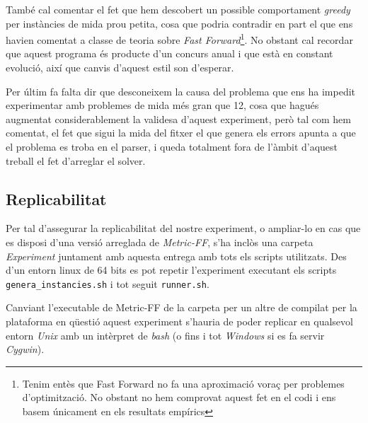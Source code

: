\documentclass[11pt,a4paper]{article}
\begin{document}
També cal comentar el fet que hem descobert un possible comportament \emph{greedy} per instàncies de mida prou petita, cosa que podria contradir en part el que ens havien comentat a classe de teoria sobre \emph{Fast Forward}\footnote{Tenim entès que Fast Forward no fa una aproximació voraç per problemes d'optimització. No obstant no hem comprovat aquest fet en el codi i ens basem únicament en els resultats empírics}. No obstant cal recordar que aquest programa és producte d'un concurs anual i que està en constant evolució, així que canvis d'aquest estil son d'esperar.

Per últim fa falta dir que desconeixem la causa del problema que ens ha impedit experimentar amb problemes de mida més gran que 12, cosa que hagués augmentat considerablement la validesa d'aquest experiment, però tal com hem comentat, el fet que sigui la mida del fitxer el que genera els errors apunta a que el problema es troba en el parser, i queda totalment fora de l'àmbit d'aquest treball el fet d'arreglar el solver.

\subsection{Replicabilitat}

Per tal d'assegurar la replicabilitat del nostre experiment, o ampliar-lo en cas que es disposi d'una versió arreglada de \emph{Metric-FF}, s'ha inclòs una carpeta \emph{Experiment} juntament amb aquesta entrega amb tots els scripts utilitzats. Des d'un entorn linux de 64 bits es pot repetir l'experiment executant els scripts \texttt{genera\_instancies.sh} i tot seguit \texttt{runner.sh}. 

Canviant l'executable de Metric-FF de la carpeta per un altre de compilat per la plataforma en qüestió aquest experiment s'hauria de poder replicar en qualsevol entorn \emph{Unix} amb un intèrpret de \emph{bash} (o fins i tot \emph{Windows} si es fa servir \emph{Cygwin}).
\end{document}
